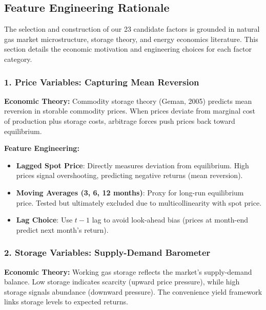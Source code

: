 \documentclass[12pt,a4paper]{article}
\begin{document}
\subsection{Feature Engineering Rationale}

The selection and construction of our 23 candidate factors is grounded in natural gas market microstructure, storage theory, and energy economics literature. This section details the economic motivation and engineering choices for each factor category.

\subsubsection{1. Price Variables: Capturing Mean Reversion}

\textbf{Economic Theory:} Commodity storage theory (Geman, 2005) predicts mean reversion in storable commodity prices. When prices deviate from marginal cost of production plus storage costs, arbitrage forces push prices back toward equilibrium.

\textbf{Feature Engineering:}
\begin{itemize}
    \item \textbf{Lagged Spot Price}: Directly measures deviation from equilibrium. High prices signal overshooting, predicting negative returns (mean reversion).
    \item \textbf{Moving Averages (3, 6, 12 months)}: Proxy for long-run equilibrium price. Tested but ultimately excluded due to multicollinearity with spot price.
    \item \textbf{Lag Choice}: Use $t-1$ lag to avoid look-ahead bias (prices at month-end predict next month's return).
\end{itemize}

\subsubsection{2. Storage Variables: Supply-Demand Barometer}

\textbf{Economic Theory:} Working gas storage reflects the market's supply-demand balance. Low storage indicates scarcity (upward price pressure), while high storage signals abundance (downward pressure). The convenience yield framework links storage levels to expected returns.
\end{document}
